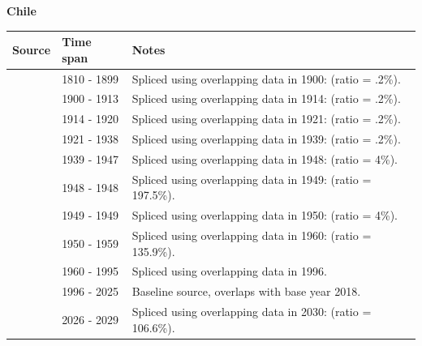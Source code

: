 \documentclass[12pt,a4paper,landscape]{article}
\begin{document}
\begin{adjustbox}{max totalsize={\paperwidth}{\paperheight},center}
\begin{minipage}[t][\textheight][t]{\textwidth}
\vspace*{0.5cm}
{}
\begin{center}
{\Large\bfseries Chile}
\end{center}
\vspace{0.5cm}
\begin{table}[H]
\centering
\small
\begin{tabular}{|l|l|l|}
\hline
\textbf{Source} & \textbf{Time span} & \textbf{Notes} \\
\hline
\rowcolor{white}\cite{Tena}& 1810 - 1899 &Spliced using overlapping data in 1900: (ratio = .2\%).\\
\rowcolor{lightgray}\cite{UN_trade}& 1900 - 1913 &Spliced using overlapping data in 1914: (ratio = .2\%).\\
\rowcolor{white}\cite{Tena}& 1914 - 1920 &Spliced using overlapping data in 1921: (ratio = .2\%).\\
\rowcolor{lightgray}\cite{UN_trade}& 1921 - 1938 &Spliced using overlapping data in 1939: (ratio = .2\%).\\
\rowcolor{white}\cite{Mitchell}& 1939 - 1947 &Spliced using overlapping data in 1948: (ratio = 4\%).\\
\rowcolor{lightgray}\cite{UN_trade}& 1948 - 1948 &Spliced using overlapping data in 1949: (ratio = 197.5\%).\\
\rowcolor{white}\cite{Mitchell}& 1949 - 1949 &Spliced using overlapping data in 1950: (ratio = 4\%).\\
\rowcolor{lightgray}\cite{UN_trade}& 1950 - 1959 &Spliced using overlapping data in 1960: (ratio = 135.9\%).\\
\rowcolor{white}\cite{WDI}& 1960 - 1995 &Spliced using overlapping data in 1996.\\
\rowcolor{lightgray}\cite{OECD_EO}& 1996 - 2025 &Baseline source, overlaps with base year 2018.\\
\rowcolor{white}\cite{IMF_WEO_forecast}& 2026 - 2029 &Spliced using overlapping data in 2030: (ratio = 106.6\%).\\
\hline
\end{tabular}
\end{table}
\begin{figure}[H]
\centering

\end{figure}
\end{minipage}
\end{adjustbox}
\end{document}
